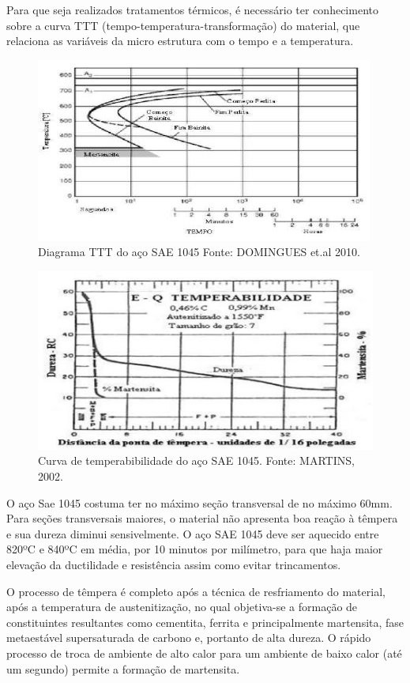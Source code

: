 Para que seja realizados tratamentos térmicos, é necessário ter conhecimento sobre a curva TTT (tempo-temperatura-transformação) do material, que relaciona as variáveis da micro estrutura com o tempo e a temperatura.
\begin{figure}[H]
	\centering
	\label{diagramattt}
	\includegraphics[keepaspectratio=true,scale=0.8]{figuras/diagramattt.JPG}
	\caption{Diagrama TTT do aço SAE 1045 Fonte: DOMINGUES et.al 2010.}
\end{figure}

\begin{figure}[H]
	\centering
	\label{curva_temperatura}
	\includegraphics[keepaspectratio=true,scale=0.8]{figuras/curva_temperatura.JPG}
	\caption{Curva de temperabibilidade do aço SAE 1045. Fonte: MARTINS, 2002.}
\end{figure}

O aço Sae 1045 costuma ter no máximo seção transversal de no máximo 60mm. Para seções transversais maiores, o material não apresenta boa reação à têmpera e sua dureza diminui sensivelmente. O aço SAE 1045 deve ser aquecido entre 820ºC e 840ºC em média, por 10 minutos por milímetro, para que haja maior elevação da ductilidade e resistência assim como evitar trincamentos.

O processo de têmpera é completo após a técnica de resfriamento do material, após a temperatura de austenitização, no qual objetiva-se a formação de constituintes resultantes como cementita, ferrita e principalmente martensita, fase metaestável supersaturada de carbono e, portanto de alta dureza. O rápido processo de troca de ambiente de alto calor para um ambiente de baixo calor (até um segundo) permite a formação de martensita.

